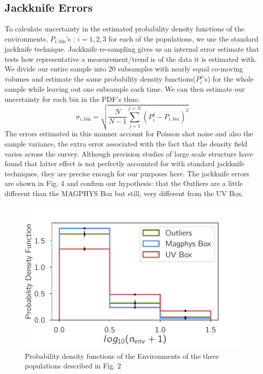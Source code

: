  \subsection{Jackknife Errors}
 To calculate uncertainty in the estimated probability density functions of the environments, $P_{i,\mathrm{bin}}$'s : $i = 1,2,3$ for each of the populations, we use the standard jackknife technique. Jackknife re-sampling gives us an internal error estimate that tests how representative a measurement/trend is of the data it is estimated with. We divide our entire sample into $20$ subsamples with nearly equal co-moving volumes and estimate the same probability density functions($P^{j}_{i}$'s) for the whole sample while leaving out one subsample each time. We can then estimate our uncertainty for each bin in the PDF's thus:\\
 $$ \sigma_{i, \mathrm{bin}} = \sqrt{\frac{N}{N-1} \sum_{j = 1}^{j = N} (P^{j}_{i} - P_{i,bin})^{2}} $$
 The errors estimated in this manner account for Poisson shot noise and also the sample variance, the extra error associated with the fact that the density field varies across the survey. Although precision studies of large scale structure have found that latter effect is not perfectly accounted for with standard jackknife techniques, they are precise enough for our purposes here. The jackknife errors are shown in Fig. $4$ and confirm our hypothesis: that the Outliers are a little different than the MAGPHYS Box but still, very different from the UV Box.\\

\begin{figure}
\includegraphics[width=\textwidth]{figures/4_jk_plot.pdf}
\caption[Short figure name.]{Probability density functions of the Environments of the three populations described in Fig. $2$
\label{fig:myInlineFigure}}
\end{figure}

